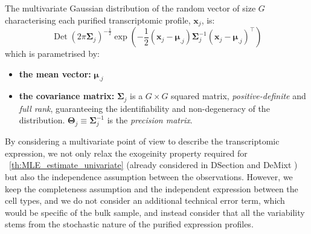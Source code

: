 \documentclass[long, final]{jobim}
\DeclareMathOperator*{\DET}{Det}
\begin{document}
\begin{definition}
\label{def:multivariate-gaussian-distribution}
The multivariate Gaussian distribution of the random vector of size $G$ characterising each purified transcriptomic profile, $\boldsymbol{x}_j$, is:
\begin{equation*}
    \DET(2\pi\boldsymbol{\Sigma}_j)^{-\frac{1}{2}} \exp\left( -\frac{1}{2} (\boldsymbol{x}_j - \boldsymbol{\mu}_{.j}) \boldsymbol{\Sigma}_j^{-1} (\boldsymbol{x}_j - \boldsymbol{\mu}_{.j})^\top\right)
\end{equation*}
which is parametrised by:
\begin{itemize}
    \item \textbf{the mean vector:} $\boldsymbol{\mu}_{.j}$ 
    \item \textbf{the covariance matrix:} $\boldsymbol{\Sigma}_j$ is a $G\times G$ squared matrix, \textit{positive-definite} and \textit{full rank}, guaranteeing the identifiability and non-degeneracy of the distribution. $\boldsymbol{\Theta}_j \equiv \boldsymbol{\Sigma}_j^{-1}$ is the \textit{precision matrix}.
\end{itemize}
\end{definition}

By considering a multivariate point of view to describe the transcriptomic expression, we not only relax the exogeinity property required for \theoremname~\ref{th:MLE_estimate_univariate} (already considered in  DSection \cite{erkkila_etal10} and DeMixt \cite{wang_etal18}) but also the independence assumption between the observations. However, we keep the completeness assumption and the independent expression between the cell types, and we do not consider an additional technical error term, which would be specific of the bulk sample, and instead consider that all the variability stems from the stochastic nature of the purified expression profiles. 
\end{document}
